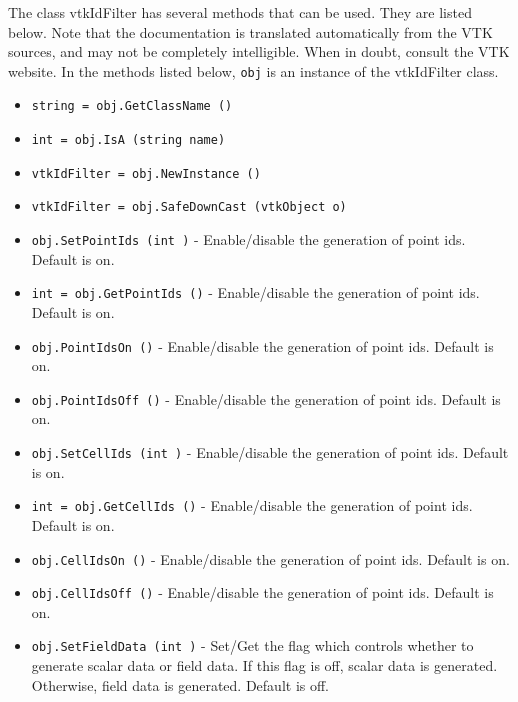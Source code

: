 The class vtkIdFilter has several methods that can be used.
  They are listed below.
Note that the documentation is translated automatically from the VTK sources,
and may not be completely intelligible.  When in doubt, consult the VTK website.
In the methods listed below, \verb|obj| is an instance of the vtkIdFilter class.
\begin{itemize}
\item  \verb|string = obj.GetClassName ()|

\item  \verb|int = obj.IsA (string name)|

\item  \verb|vtkIdFilter = obj.NewInstance ()|

\item  \verb|vtkIdFilter = obj.SafeDownCast (vtkObject o)|

\item  \verb|obj.SetPointIds (int )| -  Enable/disable the generation of point ids. Default is on.

\item  \verb|int = obj.GetPointIds ()| -  Enable/disable the generation of point ids. Default is on.

\item  \verb|obj.PointIdsOn ()| -  Enable/disable the generation of point ids. Default is on.

\item  \verb|obj.PointIdsOff ()| -  Enable/disable the generation of point ids. Default is on.

\item  \verb|obj.SetCellIds (int )| -  Enable/disable the generation of point ids. Default is on.

\item  \verb|int = obj.GetCellIds ()| -  Enable/disable the generation of point ids. Default is on.

\item  \verb|obj.CellIdsOn ()| -  Enable/disable the generation of point ids. Default is on.

\item  \verb|obj.CellIdsOff ()| -  Enable/disable the generation of point ids. Default is on.

\item  \verb|obj.SetFieldData (int )| -  Set/Get the flag which controls whether to generate scalar data
 or field data. If this flag is off, scalar data is generated.
 Otherwise, field data is generated. Default is off.


\end{itemize}
